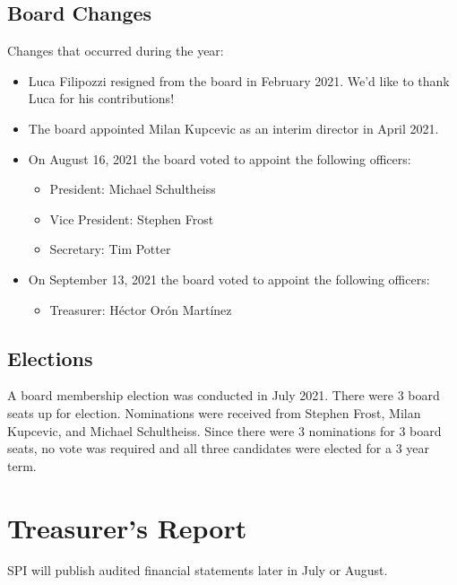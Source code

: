 \documentclass[a4paper]{report}
\begin{document}
\section{Board Changes}

Changes that occurred during the year:

\begin{itemize}

\item Luca Filipozzi resigned from the board in February 2021.  We'd like to thank Luca for his contributions!

\item The board appointed Milan Kupcevic as an interim director in April 2021.

\item On August 16, 2021 the board voted to appoint the following officers:

\begin{itemize}
\item President: Michael Schultheiss
\item Vice President: Stephen Frost
\item Secretary: Tim Potter
\end{itemize}

\item On September 13, 2021 the board voted to appoint the following officers:

\begin{itemize}
\item Treasurer: Héctor Orón Martínez
\end{itemize}

\end{itemize}

\section{Elections}

A board membership election was conducted in July 2021.  There were 3 board seats up for election.  Nominations were received from Stephen Frost, Milan Kupcevic, and Michael Schultheiss.  Since there were 3 nominations for 3 board seats, no vote was required and all three candidates were elected for a 3 year term.

\chapter{Treasurer's Report}

SPI will publish audited financial statements later in July or August.
\end{document}
